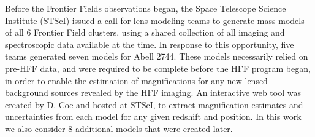 Before the Frontier Fields observations began, the Space Telescope
Science Institute (STScI) issued a call for lens modeling teams to
generate mass models of all 6 Frontier Field clusters, using a shared
collection of all imaging and spectroscopic data available at the
time.  In response to this opportunity, five teams generated seven
models for Abell 2744.  These models necessarily relied on
pre-HFF data, and were required to be complete before the HFF program
began, in order to enable the estimation of magnifications for any new
lensed background sources revealed by the HFF imaging. An interactive
web tool was created by D. Coe and hosted at STScI, to extract
magnification estimates and uncertainties from each model for any
given redshift and position.  In this work we also consider 8
additional models that were created later.  



